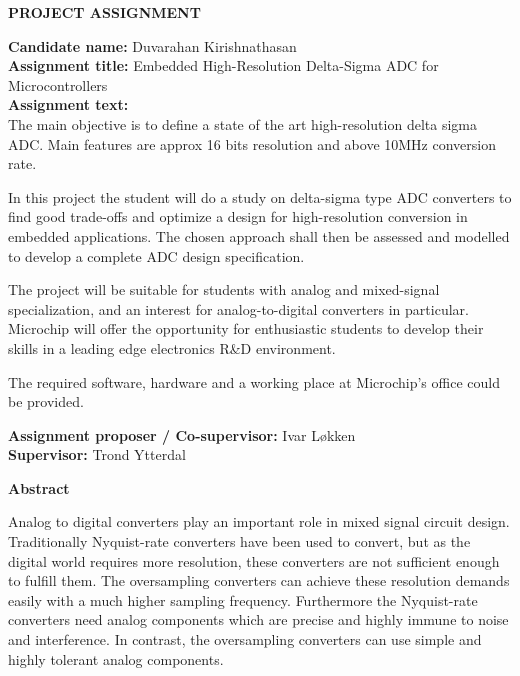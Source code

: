 \documentclass[pdftex,10pt,b5paper,twoside]{book}
\begin{document}


\begin{center}
 \textbf{PROJECT ASSIGNMENT}\\[4ex]
\end{center}
\textbf{Candidate name:} Duvarahan Kirishnathasan\\[4ex]
\textbf{Assignment title:} Embedded High-Resolution Delta-Sigma ADC for Microcontrollers\\[4ex]
\textbf{Assignment text:}\\[2ex]
The main objective is to define a state of the art high-resolution delta sigma ADC. Main features are approx 16 bits resolution and above 10MHz conversion rate.

In this project the student will do a study on delta-sigma type ADC converters to find good trade-offs and optimize a design for high-resolution conversion in embedded applications. The chosen approach shall then be assessed and modelled to develop a complete ADC design specification.

The project will be suitable for students with analog and mixed-signal specialization, and an interest for analog-to-digital converters in particular. Microchip will offer the opportunity for enthusiastic students to develop their skills in a leading edge electronics R\&D environment.

The required software, hardware and a working place at Microchip’s office could be provided.


\textbf{Assignment proposer / Co-supervisor:} Ivar Løkken\\[4ex]
\textbf{Supervisor:} Trond Ytterdal



\begin{center}
    \textbf{Abstract}
\end{center}
Analog to digital converters play an important role in mixed signal circuit design. Traditionally Nyquist-rate converters have been used to convert, but as the digital world requires more resolution, these converters are not sufficient enough to fulfill them. The oversampling converters can achieve these resolution demands easily with a much higher sampling frequency. Furthermore the Nyquist-rate converters need analog components which are precise and highly immune to noise and interference. In contrast, the oversampling converters can use simple and highly tolerant analog components.



\tableofcontents
\listoffigures
\listoftables














\end{document}
